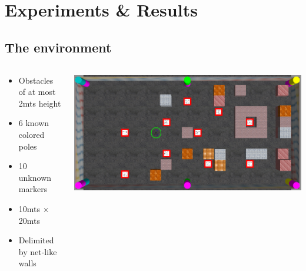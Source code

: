 \documentclass[serif]{beamer}
\begin{document}

    \section{Experiments \& Results}
    \subsection{The environment}
    \begin{frame}
        \begin{columns}[T]
            \begin{column}{.5\textwidth}
                \begin{itemize}
                    \item{Obstacles of at most 2mts height}
                    \item{6 known colored poles}
                    \item{10 unknown markers}
                    \item{10mts $\times$ 20mts}
                    \item{Delimited by net-like walls}
                \end{itemize}
            \end{column}
            \begin{column}{.5\textwidth}
                \centering
                \includegraphics[width=\linewidth,angle=90,origin=c]{Images/fig18-gazebo-environment}
            \end{column}
        \end{columns}
    \end{frame}
\end{document}
